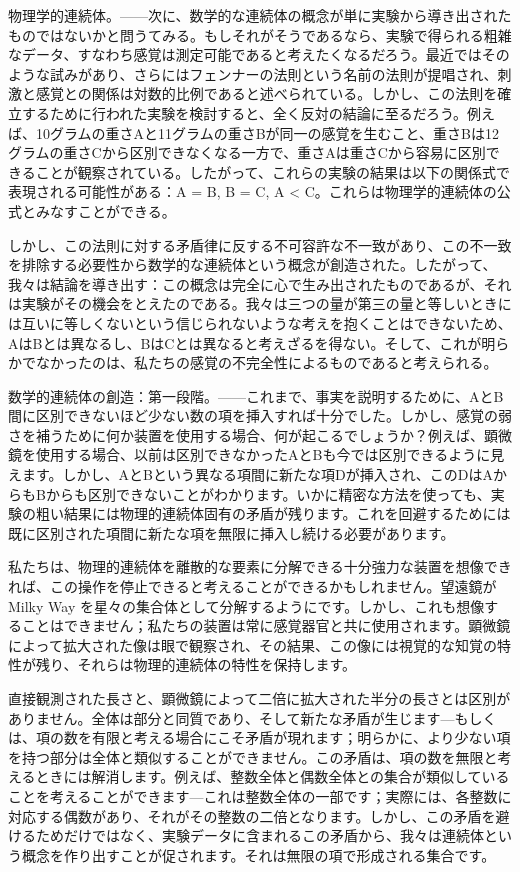 \documentclass[a4paper,11pt,openany]{ltjsbook}
\begin{document}
物理学的連続体。——次に、数学的な連続体の概念が単に実験から導き出されたものではないかと問うてみる。もしそれがそうであるなら、実験で得られる粗雑なデータ、すなわち感覚は測定可能であると考えたくなるだろう。最近ではそのような試みがあり、さらにはフェンナーの法則という名前の法則が提唱され、刺激と感覚との関係は対数的比例であると述べられている。しかし、この法則を確立するために行われた実験を検討すると、全く反対の結論に至るだろう。例えば、10グラムの重さAと11グラムの重さBが同一の感覚を生むこと、重さBは12グラムの重さCから区別できなくなる一方で、重さAは重さCから容易に区別できることが観察されている。したがって、これらの実験の結果は以下の関係式で表現される可能性がある：A = B, B = C, A < C。これらは物理学的連続体の公式とみなすことができる。

しかし、この法則に対する矛盾律に反する不可容許な不一致があり、この不一致を排除する必要性から数学的な連続体という概念が創造された。したがって、我々は結論を導き出す：この概念は完全に心で生み出されたものであるが、それは実験がその機会をとえたのである。我々は三つの量が第三の量と等しいときには互いに等しくないという信じられないような考えを抱くことはできないため、AはBとは異なるし、BはCとは異なると考えざるを得ない。そして、これが明らかでなかったのは、私たちの感覚の不完全性によるものであると考えられる。

数学的連続体の創造：第一段階。——これまで、事実を説明するために、AとB間に区別できないほど少ない数の項を挿入すれば十分でした。しかし、感覚の弱さを補うために何か装置を使用する場合、何が起こるでしょうか？例えば、顕微鏡を使用する場合、以前は区別できなかったAとBも今では区別できるように見えます。しかし、AとBという異なる項間に新たな項Dが挿入され、このDはAからもBからも区別できないことがわかります。いかに精密な方法を使っても、実験の粗い結果には物理的連続体固有の矛盾が残ります。これを回避するためには既に区別された項間に新たな項を無限に挿入し続ける必要があります。

私たちは、物理的連続体を離散的な要素に分解できる十分強力な装置を想像できれば、この操作を停止できると考えることができるかもしれません。望遠鏡が Milky Way を星々の集合体として分解するようにです。しかし、これも想像することはできません；私たちの装置は常に感覚器官と共に使用されます。顕微鏡によって拡大された像は眼で観察され、その結果、この像には視覚的な知覚の特性が残り、それらは物理的連続体の特性を保持します。

直接観測された長さと、顕微鏡によって二倍に拡大された半分の長さとは区別がありません。全体は部分と同質であり、そして新たな矛盾が生じます—もしくは、項の数を有限と考える場合にこそ矛盾が現れます；明らかに、より少ない項を持つ部分は全体と類似することができません。この矛盾は、項の数を無限と考えるときには解消します。例えば、整数全体と偶数全体との集合が類似していることを考えることができます—これは整数全体の一部です；実際には、各整数に対応する偶数があり、それがその整数の二倍となります。しかし、この矛盾を避けるためだけではなく、実験データに含まれるこの矛盾から、我々は連続体という概念を作り出すことが促されます。それは無限の項で形成される集合です。
\end{document}
